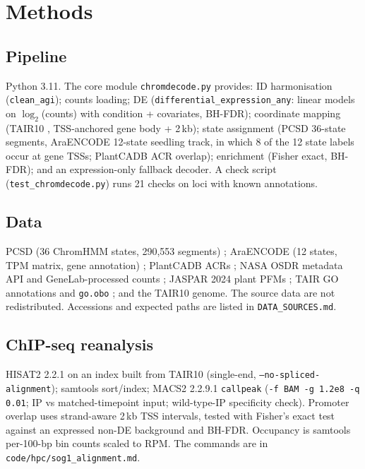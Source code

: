 \documentclass[11pt,a4paper]{article}
\begin{document}
\section{Methods}

\subsection*{Pipeline}
Python 3.11. The core module \texttt{chromdecode.py} provides: ID harmonisation
(\texttt{clean\_agi}); counts loading; DE (\texttt{differential\_expression\_any}: linear models
on $\log_2$(counts) with condition + covariates, BH-FDR); coordinate mapping (TAIR10
\citep{berardini2015tair}, TSS-anchored gene body + 2\,kb); state assignment (PCSD 36-state segments,
AraENCODE 12-state seedling track, in which 8 of the 12 state labels occur at gene TSSs; PlantCADB ACR overlap); enrichment (Fisher exact, BH-FDR); and an
expression-only fallback decoder. A check script (\texttt{test\_chromdecode.py}) runs 21
checks on loci with known annotations.

\subsection*{Data}
PCSD (36 ChromHMM states, 290,553 segments) \citep{liu2018pcsd}; AraENCODE (12 states,
TPM matrix, gene annotation) \citep{wang2023araencode}; PlantCADB ACRs \citep{ding2023plantcadb}; NASA OSDR
metadata API and GeneLab-processed counts \citep{gebre2025osdr,berrios2021genelab}; JASPAR 2024 plant PFMs
\citep{rauluseviciute2024jaspar}; TAIR GO annotations and \texttt{go.obo} \citep{go2023knowledgebase}; and the TAIR10 genome. The source
data are not redistributed. Accessions and expected paths are listed in
\texttt{DATA\_SOURCES.md}.

\subsection*{ChIP-seq reanalysis}
HISAT2 2.2.1 on an index built from TAIR10 (single-end, \texttt{--no-spliced-alignment}); samtools
sort/index; MACS2 2.2.9.1 \texttt{callpeak} (\texttt{-f BAM -g 1.2e8 -q 0.01}; IP vs
matched-timepoint input; wild-type-IP specificity check). Promoter overlap uses strand-aware 2\,kb TSS
intervals, tested with Fisher's exact test against an expressed non-DE background and BH-FDR. Occupancy is
samtools per-100-bp bin counts scaled to RPM. The commands are in \texttt{code/hpc/sog1\_alignment.md}.
\end{document}
